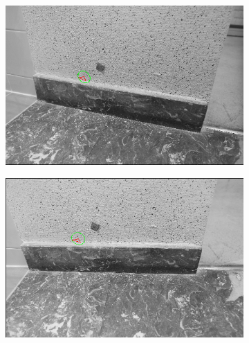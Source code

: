 \begin{enumerate}
\begin{figure}
\begin{subfigure}[b]{0.16\textwidth}
        \end{subfigure}%
                \hfill
        \begin{subfigure}[b]{0.16\textwidth}
                \includegraphics[width=\linewidth]{FIGS/TaskCorrel/EllipseAffine/imgD.png}
        \end{subfigure}
                \hfill
        \begin{subfigure}[b]{0.16\textwidth}
                \includegraphics[width=\linewidth]{FIGS/TaskCorrel/EllipseAffine/imgE.png}
        \end{subfigure}
                 \hfill
        \begin{subfigure}[b]{0.16\textwidth}

\end{subfigure}
\end{figure}
\end{enumerate}
